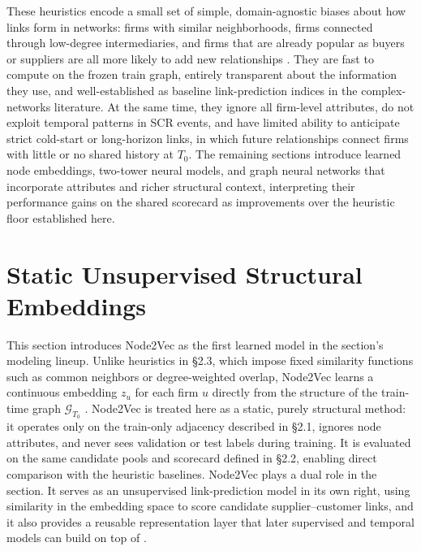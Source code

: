 These heuristics encode a small set of simple, domain-agnostic biases about how links form in networks: firms with similar neighborhoods, firms connected through low-degree intermediaries, and firms that are already popular as buyers or suppliers are all more likely to add new relationships \parencite{liben-nowell_link_2003,lu_link_2011}. They are fast to compute on the frozen train graph, entirely transparent about the information they use, and well-established as baseline link-prediction indices in the complex-networks literature. At the same time, they ignore all firm-level attributes, do not exploit temporal patterns in SCR events, and have limited ability to anticipate strict cold-start or long-horizon links, in which future relationships connect firms with little or no shared history at \(T_0\). The remaining sections introduce learned node embeddings, two-tower neural models, and graph neural networks that incorporate attributes and richer structural context, interpreting their performance gains on the shared scorecard as improvements over the heuristic floor established here.

\section{Static Unsupervised Structural Embeddings}

This section introduces Node2Vec as the first learned model in the section's modeling lineup. Unlike heuristics in \S2.3, which impose fixed similarity functions such as common neighbors or degree-weighted overlap, Node2Vec learns a continuous embedding \(z_u\) for each firm \(u\) directly from the structure of the train-time graph \(\mathcal{G}_{T_0}\) \parencite{grover_node2vec_2016}. Node2Vec is treated here as a static, purely structural method: it operates only on the train-only adjacency described in \S2.1, ignores node attributes, and never sees validation or test labels during training. It is evaluated on the same candidate pools and scorecard defined in \S2.2, enabling direct comparison with the heuristic baselines. Node2Vec plays a dual role in the section. It serves as an unsupervised link-prediction model in its own right, using similarity in the embedding space to score candidate supplier--customer links, and it also provides a reusable representation layer that later supervised and temporal models can build on top of \parencite{hamilton_representation_2017,cai_comprehensive_2018}.


